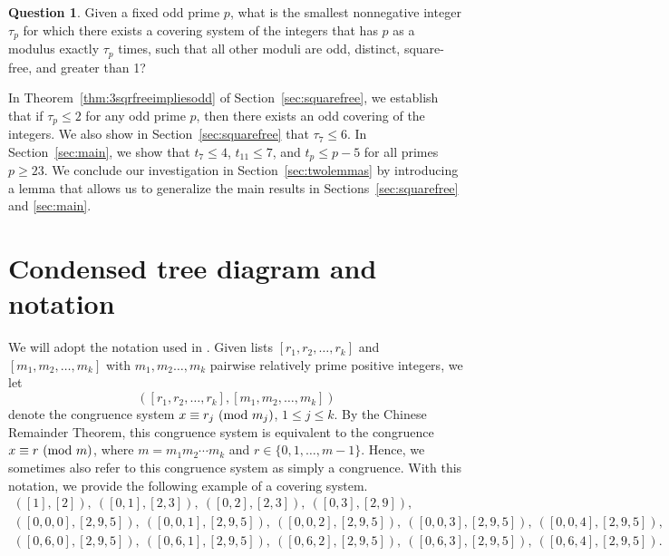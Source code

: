 \documentclass[12pt]{article}
\theoremstyle{definition}
\newtheorem{question}[theorem]{Question}
\renewcommand{\mod}[2]{#1\textup{ (mod }#2\textup{)}}
\begin{document}

\begin{question}\label{question:mainquestionsquarefree}
Given a fixed odd prime $p$, what is the smallest nonnegative integer $\tau_p$ for which there exists a covering system of the integers that has $p$ as a modulus exactly $\tau_p$ times, such that all other moduli are odd, distinct, square-free, and greater than 1?
\end{question}

In Theorem~\ref{thm:3sqrfreeimpliesodd} of Section~\ref{sec:squarefree}, we establish that if $\tau_p\leq 2$ for any odd prime $p$, then there exists an odd covering of the integers.  We also show in Section~\ref{sec:squarefree} that $\tau_7\leq 6$.  In Section~\ref{sec:main}, we show that $t_7\leq 4$, $t_{11}\leq 7$, and $t_p\leq p-5$ for all primes $p\geq23$.  We conclude our investigation in Section~\ref{sec:twolemmas} by introducing a lemma that allows us to generalize the main results in Sections~\ref{sec:squarefree} and \ref{sec:main}.


\section{Condensed tree diagram and notation}\label{sec:tree}

We will adopt the notation used in \cite{filharr}.  Given lists $[r_1,r_2,\ldots,r_k]$ and $[m_1,m_2,\ldots,m_k]$ with $m_1,m_2\ldots,m_k$ pairwise relatively prime positive integers, we let 
$$([r_1,r_2,\ldots,r_k],[m_1,m_2,\ldots,m_k])$$
denote the congruence system $x\equiv\mod{r_j}{m_j}$, $1\leq j\leq k$. By the Chinese Remainder Theorem, this congruence system is equivalent to the congruence $x\equiv\mod{r}{m}$, where $m=m_1m_2\cdots m_k$ and $r\in\{0,1,\dotsc,m-1\}$. Hence, we sometimes also refer to this congruence system as simply a congruence. With this notation, we provide the following example of a covering system.
\begin{equation}\label{eq:example}\begin{gathered}
([1],[2]),\ ([0,1],[2,3]),\ ([0,2],[2,3]),\ ([0,3],[2,9]),\\
([0,0,0],[2,9,5]),\ ([0,0,1],[2,9,5]),\ ([0,0,2],[2,9,5]),\ ([0,0,3],[2,9,5]),\ ([0,0,4],[2,9,5]),\\
([0,6,0],[2,9,5]),\ ([0,6,1],[2,9,5]),\ ([0,6,2],[2,9,5]),\ ([0,6,3],[2,9,5]),\ ([0,6,4],[2,9,5]).
\end{gathered}\end{equation}
\end{document}
